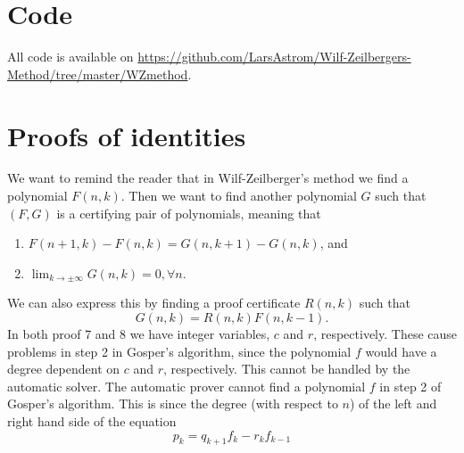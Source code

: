 \section{Code}
All code is available on \url{https://github.com/LarsAstrom/Wilf-Zeilbergers-Method/tree/master/WZmethod}.
\section{Proofs of identities}
We want to remind the reader that in Wilf-Zeilberger's method we find a polynomial $F(n,k)$. Then we want to find another polynomial $G$ such that $(F,G)$ is a certifying pair of polynomials, meaning that
\begin{enumerate}
  \item $F(n+1,k)-F(n,k)=G(n,k+1)-G(n,k)$, and
  \item $\lim_{k\to\pm\infty} G(n,k)=0, \forall n$.
\end{enumerate}
We can also express this by finding a proof certificate $R(n,k)$ such that
\begin{equation*}
  G(n,k)=R(n,k)F(n,k-1).
\end{equation*}
In both proof 7 and 8 we have integer variables, $c$ and $r$, respectively. These cause problems in step 2 in Gosper's algorithm, since the polynomial $f$ would have a degree dependent on $c$ and $r$, respectively. This cannot be handled by the automatic solver.
The automatic prover cannot find a polynomial $f$ in step 2 of Gosper's algorithm. This is since the degree (with respect to $n$) of the left and right hand side of the equation
\begin{equation}
  p_k=q_{k+1}f_k-r_kf_{k-1}
\end{equation}
